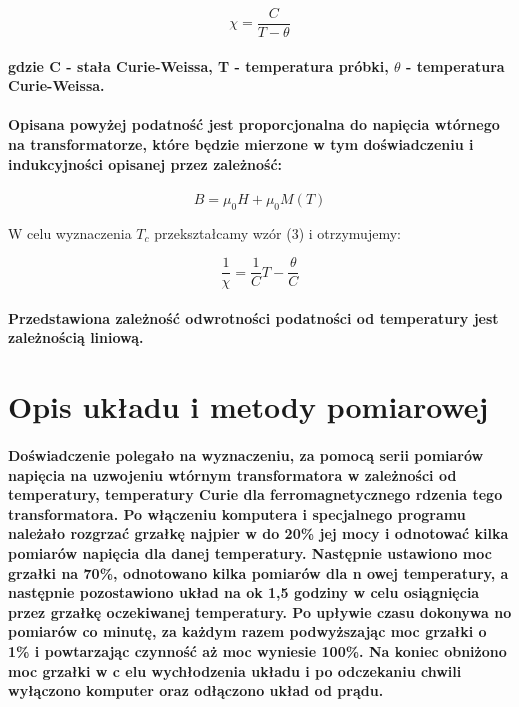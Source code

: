 \documentclass[a4paper,10pt]{article}
\begin{document}
\begin{equation}
\chi = \frac{C}{T - \theta}
\end{equation}

\paragraph{gdzie C - stała Curie-Weissa, T - temperatura próbki, $\theta$ - temperatura Curie-Weissa.}

\paragraph{Opisana powyżej podatność jest proporcjonalna do napięcia wtórnego na transformatorze, które będzie mierzone w tym doświadczeniu i indukcyjności opisanej przez zależność:}

\begin{equation}
B = \mu_0 H + \mu_0 M(T)
\end{equation}

W celu wyznaczenia $T_c$ przekształcamy wzór (3) i otrzymujemy:

\begin{equation}
\frac{1}{\chi} = \frac{1}{C} T - \frac{\theta}{C}
\end{equation}

\paragraph{Przedstawiona zależność odwrotności podatności od temperatury jest zależnością liniową.}

\section{Opis układu i metody pomiarowej}
\paragraph{Doświadczenie polegało na wyznaczeniu, za pomocą serii pomiarów napięcia na uzwojeniu wtórnym transformatora w zależności od temperatury,
temperatury Curie dla ferromagnetycznego rdzenia tego transformatora. Po włączeniu komputera i specjalnego programu należało rozgrzać grzałkę najpier
w do 20\% jej mocy i odnotować kilka pomiarów napięcia dla danej temperatury. Następnie ustawiono moc grzałki na 70\%, odnotowano kilka pomiarów dla n
owej temperatury, a następnie pozostawiono układ na ok 1,5 godziny w celu osiągnięcia przez grzałkę oczekiwanej temperatury. Po upływie czasu dokonywa
no pomiarów co minutę, za każdym razem podwyższając moc grzałki o 1\% i powtarzając czynność aż moc wyniesie 100\%. Na koniec obniżono moc grzałki w c
elu wychłodzenia układu i po odczekaniu chwili wyłączono komputer oraz odłączono układ od prądu.\\}
\end{document}
